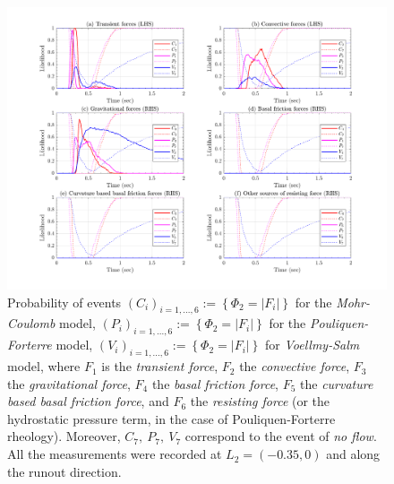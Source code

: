 \documentclass{article}
\begin{document}
\begin{figure}[H]
        \centering
        \includegraphics[width=1\textwidth]{InclinedPlane/LocalRecords/DominancePrX_L2.png}
        \caption{Probability of events $(C_i)_{i=1,...,6}:=\left\{\Phi_2=|F_i|\right\}$ for the \emph{Mohr-Coulomb} model, $(P_i)_{i=1,...,6}:=\left\{\Phi_2=|F_i|\right\}$ for the \emph{Pouliquen-Forterre} model, $(V_i)_{i=1,...,6}:=\left\{\Phi_2=|F_i|\right\}$ for \emph{Voellmy-Salm} model, where $F_1$ is the \emph{transient force}, $F_2$ the \emph{convective force}, $F_3$ the \emph{gravitational force}, $F_4$ the \emph{basal friction force}, $F_5$ the \emph{curvature based basal friction force}, and $F_6$ the \emph{resisting force} (or the hydrostatic pressure term, in the case of Pouliquen-Forterre rheology). Moreover, $C_7,\ P_7,\ V_7$ correspond to the event of \emph{no flow}. All the measurements were recorded at $L_2=(-0.35,0)$ and along the runout direction.}
        \label{fig:Ramp-FXDominance-L2}
\end{figure}
\end{document}
